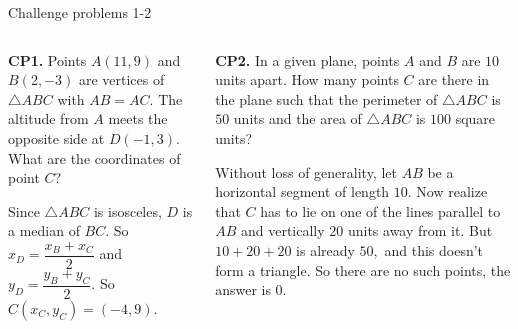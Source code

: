 \documentclass[9pt,aspectratio=169,handout]{beamer}
\begin{document}
\begin{frame}{Challenge problems 1-2}
  \begin{columns}[T]
    \begin{column}{0.5\textwidth}
      \begin{problem}
        \textbf{CP1.} Points $A(11, 9)$ and $B(2, -3)$ are vertices of $\triangle ABC$ with $AB=AC$. The altitude from $A$ meets the opposite side at $D(-1, 3)$. What are the coordinates of point $C$?
      \end{problem}\pause
      Since $\triangle ABC$ is isosceles, $D$ is a median of $BC$. So $x_D = \dfrac{x_B + x_C}{2}$ and $y_D = \dfrac{y_B + y_C}{2}$. So $C(x_C, y_C) = \boxed{(-4, 9)}$.\pause
    \end{column}
    \begin{column}{0.5\textwidth}
      \begin{problem}
        \textbf{CP2.} In a given plane, points $A$ and $B$ are $10$ units apart. How many points $C$ are there in the plane such that the perimeter of $\triangle ABC$ is $50$ units and the area of $\triangle ABC$ is $100$ square units?
      \end{problem}\pause

      Without loss of generality, let $AB$ be a horizontal segment of length $10$. Now realize that $C$ has to lie on one of the lines parallel to $AB$ and vertically $20$ units away from it. But $10+20+20$ is already $50,$ and this doesn't form a triangle. So there are no such points, the answer is $\boxed{0}$.
    \end{column}
  \end{columns}
\end{frame}
\end{document}

